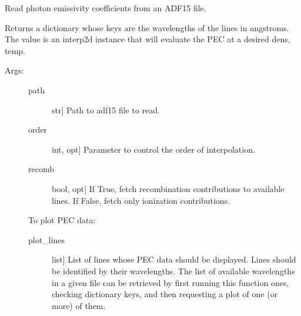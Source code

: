 \documentclass[letterpaper,10pt,english]{sphinxmanual}
\begin{document}

\begin{fulllineitems}
\label{\detokenize{aurora:aurora.atomic.read_adf15}}
Read photon emissivity coefficients from an ADF15 file.

Returns a dictionary whose keys are the wavelengths of the lines in
angstroms. The value is an interp2d instance that will evaluate the PEC at
a desired dens, temp.
\begin{description}
\item[{Args:}] \leavevmode\begin{description}
\item[{path}] \leavevmode{[}str{]}
Path to adf15 file to read.

\item[{order}] \leavevmode{[}int, opt{]}
Parameter to control the order of interpolation.

\item[{recomb}] \leavevmode{[}bool, opt{]}
If True, fetch recombination contributions to available lines. If False,
fetch only ionization contributions.

\end{description}

To plot PEC data:
\begin{description}
\item[{plot\_lines}] \leavevmode{[}list{]}
List of lines whose PEC data should be displayed. Lines should be identified
by their wavelengths. The list of available wavelengths in a given file can be retrieved
by first running this function ones, checking dictionary keys, and then requesting a
plot of one (or more) of them.


\end{description}
\end{description}
\end{fulllineitems}
\end{document}

